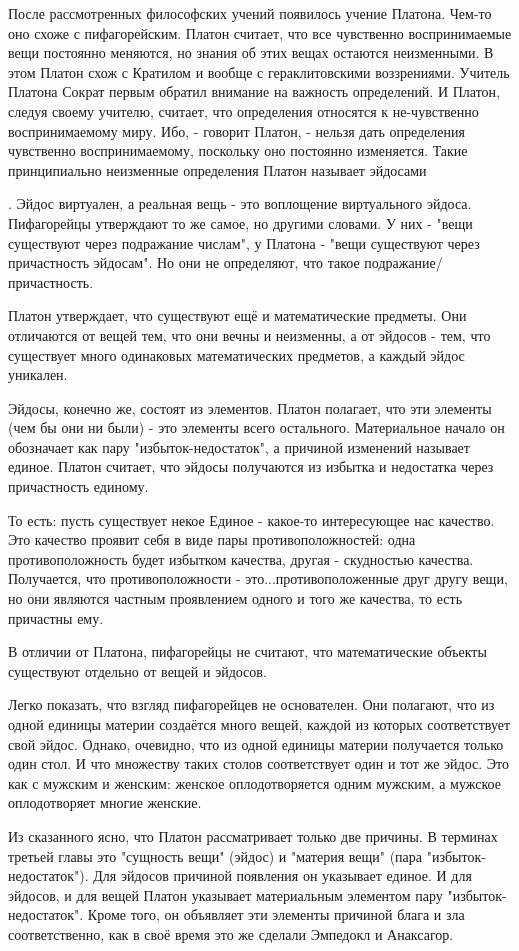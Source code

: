 \documentclass{article}
\begin{document}
После рассмотренных философских учений появилось учение Платона. Чем-то оно схоже с пифагорейским. Платон считает, что все чувственно воспринимаемые вещи постоянно меняются, но знания об этих вещах остаются неизменными. В этом Платон схож с Кратилом и вообще с гераклитовскими воззрениями. Учитель Платона Сократ первым обратил внимание на важность определений. И Платон, следуя своему учителю, считает, что определения относятся к не-чувственно воспринимаемому миру. Ибо, - говорит Платон, - нельзя дать определения чувственно воспринимаемому, поскольку оно постоянно изменяется. Такие принципиально неизменные определения Платон называет эйдосами
\footnotemark[1]

\footnotemark[2]
. Эйдос виртуален, а реальная вещь - это воплощение виртуального эйдоса. Пифагорейцы утверждают то же самое, но другими словами. У них - "вещи существуют через подражание числам", у Платона - "вещи существуют через причастность эйдосам". Но они не определяют, что такое подражание/причастность.

Платон утверждает, что существуют ещё и математические предметы. Они отличаются от вещей тем, что они вечны и неизменны, а от эйдосов - тем, что существует много одинаковых математических предметов, а каждый эйдос уникален.
\footnotemark[3]


Эйдосы, конечно же, состоят из элементов. Платон полагает, что эти элементы (чем бы они ни были) - это элементы всего остального. Материальное начало он обозначает как пару "избыток-недостаток", а причиной изменений называет единое.
\footnotemark[4]
Платон считает, что эйдосы получаются из избытка и недостатка через причастность единому.
\footnotemark[5]

\footnotemark[6]
То есть: пусть существует некое Единое - какое-то интересующее нас качество. Это качество проявит себя в виде пары противоположностей: одна противоположность будет избытком качества, другая - скудностью качества. Получается, что противоположности - это...противоположенные друг другу вещи, но они являются частным проявлением одного и того же качества, то есть причастны ему.

В отличии от Платона, пифагорейцы не считают, что математические объекты существуют отдельно от вещей и эйдосов.
\footnotemark[7]


Легко показать, что взгляд пифагорейцев не основателен. Они полагают, что из одной единицы материи создаётся много вещей, каждой из которых соответствует свой эйдос. Однако, очевидно, что из одной единицы материи получается только один стол. И что множеству таких столов соответствует один и тот же эйдос. Это как с мужским и женским: женское оплодотворяется одним мужским, а мужское оплодотворяет многие женские.

Из сказанного ясно, что Платон рассматривает только две причины. В терминах третьей главы это "сущность вещи" (эйдос) и "материя вещи" (пара "избыток-недостаток"). Для эйдосов причиной появления он указывает единое. И для эйдосов, и для вещей Платон указывает материальным элементом пару "избыток-недостаток". Кроме того, он объявляет эти элементы причиной блага и зла соответственно, как в своё время это же сделали Эмпедокл и Анаксагор.
\end{document}
